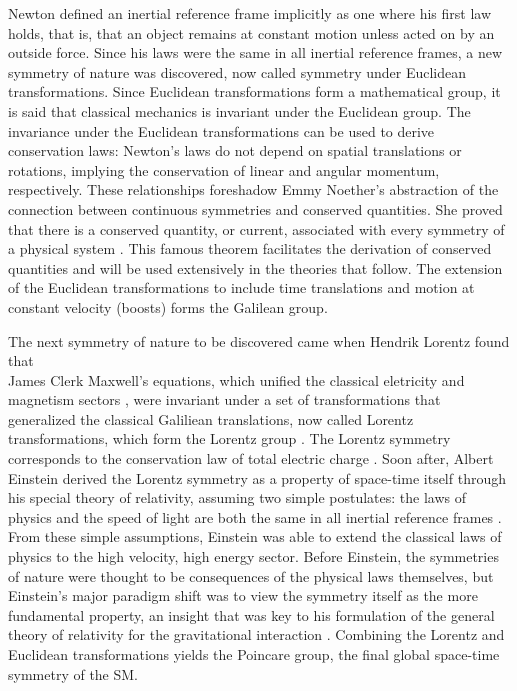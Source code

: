 \indent Newton defined an inertial reference frame implicitly as one where his first law holds, that is, that an object remains at constant motion unless acted on by an outside force. Since his laws were the same in all inertial reference frames, a new symmetry of nature was discovered, now called symmetry under Euclidean transformations. Since Euclidean transformations form a mathematical group, it is said that classical mechanics is invariant under the Euclidean group. The invariance under the Euclidean transformations can be used to derive conservation laws: Newton's laws do not depend on spatial translations or rotations, implying the conservation of linear and angular momentum, respectively. These relationships foreshadow Emmy Noether's abstraction of the connection between continuous symmetries and conserved quantities. She proved that there is a conserved quantity, or current, associated with every symmetry of a physical system \cite{Noether:1918zz}. This famous theorem facilitates the derivation of conserved quantities and will be used extensively in the theories that follow. The extension of the Euclidean transformations to include time translations and motion at constant velocity (boosts) forms the Galilean group.

\indent The next symmetry of nature to be discovered came when Hendrik Lorentz found that \\
James Clerk Maxwell's equations, which unified the classical eletricity and magnetism sectors \cite{Maxwell01011865}, were invariant under a set of transformations that generalized the classical Galiliean translations, now called Lorentz transformations, which form the Lorentz group \cite{Lorentz}. The Lorentz symmetry corresponds to the conservation law of total electric charge \cite{Noether:1918zz2}. Soon after, Albert Einstein derived the Lorentz symmetry as a property of space-time itself through his special theory of relativity, assuming two simple postulates: the laws of physics and the speed of light are both the same in all inertial reference frames \cite{Einstein:1905ve}. From these simple assumptions, Einstein was able to extend the classical laws of physics to the high velocity, high energy sector. Before Einstein, the symmetries of nature were thought to be consequences of the physical laws themselves, but Einstein's major paradigm shift was to view the symmetry itself as the more fundamental property, an insight that was key to his formulation of the general theory of relativity for the gravitational interaction \cite{Einstein:1914bt}. Combining the Lorentz and Euclidean transformations yields the Poincare group, the final global space-time symmetry of the SM.

